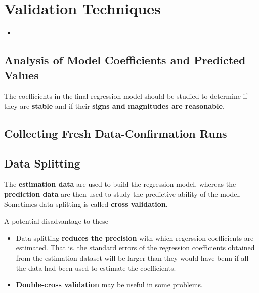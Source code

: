 \documentclass[12pt]{article}
\begin{document}
\section{Validation Techniques}

\begin{itemize}
	\item 
\end{itemize}


\subsection{Analysis of Model Coefficients and Predicted Values}

The coefficients in the final regression model should be studied to determine if they are \textbf{stable} and if their \textbf{signs and magnitudes are reasonable}.


\subsection{Collecting Fresh Data-Confirmation Runs}



\subsection{Data Splitting}

The \textbf{estimation data} are used to build the regression model, whereas the \textbf{prediction data} are then used to study the predictive ability of the model. Sometimes data splitting is called \textbf{cross validation}. 



A potential disadvantage to these 



\begin{itemize}
	\item Data splitting \textbf{reduces the precision} with which regerssion coefficients are estimated. That is, the standard errors of the regression coefficients obtained from the estimation dataset will be larger than they would have benn if all the data had been used to estimate the coefficients. 
	\item \textbf{Double-cross validation} may be useful in some problems.
\end{itemize}
\end{document}
